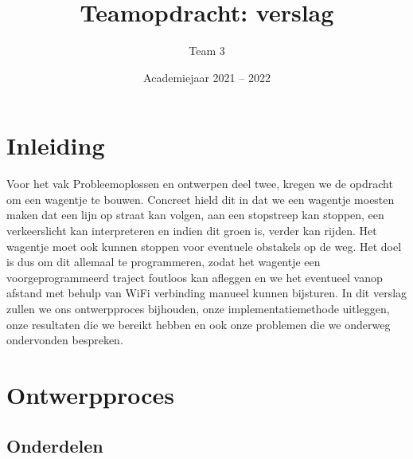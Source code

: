 \documentclass[kulak]{kulakarticle} %
\title{Teamopdracht: verslag}
\author{Team 3}
\date{Academiejaar 2021 -- 2022}
\begin{document}
\maketitle

\tableofcontents

\section*{Inleiding}
Voor het vak Probleemoplossen en ontwerpen deel twee, kregen we de opdracht om een wagentje te bouwen. Concreet hield dit in dat we een wagentje moesten maken dat een lijn op straat kan volgen, aan een stopstreep kan stoppen, een verkeerslicht kan interpreteren en indien dit groen is, verder kan rijden. Het wagentje moet ook kunnen stoppen voor eventuele obstakels op de weg. Het doel is dus om dit allemaal te programmeren, zodat het wagentje een voorgeprogrammeerd traject foutloos kan afleggen en we het eventueel vanop afstand met behulp van WiFi verbinding manueel kunnen bijsturen.
In dit verslag zullen we ons ontwerpproces bijhouden, onze implementatiemethode uitleggen, onze resultaten die we bereikt hebben en ook onze problemen die we onderweg ondervonden bespreken. 




\section{Ontwerpproces}
\subsection{Onderdelen}
\end{document}
